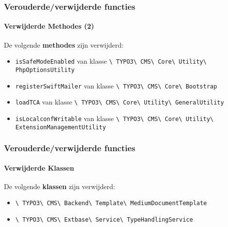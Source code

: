 \begin{frame}[fragile]
	\frametitle{Verouderde/verwijderde functies}
	\framesubtitle{Verwijderde Methodes (2)}

	De volgende \textbf{methodes} zijn verwijderd:

	\begin{itemize}

		\item
			\small
				\texttt{isSafeModeEnabled}\newline
				van klasse
				\texttt{\textbackslash
					TYPO3\textbackslash
					CMS\textbackslash
					Core\textbackslash
					Utility\textbackslash
					PhpOptionsUtility}
			\normalsize
		\item
			\small
				\texttt{registerSwiftMailer}\newline
				van klasse
				\texttt{\textbackslash
					TYPO3\textbackslash
					CMS\textbackslash
					Core\textbackslash
					Bootstrap}
			\normalsize
		\item
			\small
				\texttt{loadTCA}\newline
				van klasse
				\texttt{\textbackslash
					TYPO3\textbackslash
					CMS\textbackslash
					Core\textbackslash
					Utility\textbackslash
					GeneralUtility}
			\normalsize
		\item
			\small
				\texttt{isLocalconfWritable}\newline
				van klasse
				\texttt{\textbackslash
					TYPO3\textbackslash
					CMS\textbackslash
					Core\textbackslash
					Utility\textbackslash
					ExtensionManagementUtility}
			\normalsize

	\end{itemize}

\end{frame}


\begin{frame}[fragile]
	\frametitle{Verouderde/verwijderde functies}
	\framesubtitle{Verwijderde Klassen}

	De volgende \textbf{klassen} zijn verwijderd:

	\begin{itemize}

		\item
			\smaller
				\texttt{\textbackslash
					TYPO3\textbackslash
					CMS\textbackslash
					Backend\textbackslash
					Template\textbackslash
					MediumDocumentTemplate}
			\normalsize
		\item
			\smaller
				\texttt{\textbackslash
					TYPO3\textbackslash
					CMS\textbackslash
					Extbase\textbackslash
					Service\textbackslash
					TypeHandlingService}
			\normalsize

	\end{itemize}

\end{frame}

